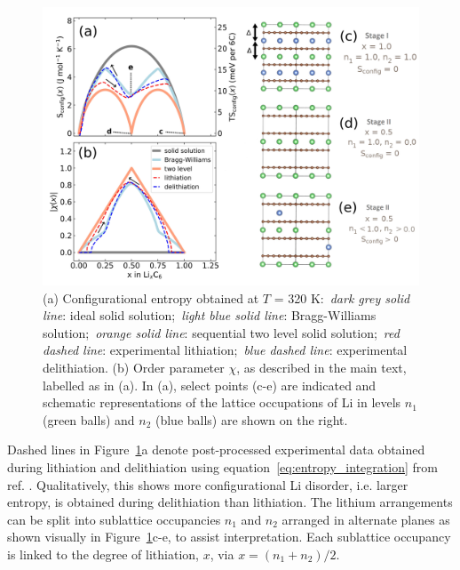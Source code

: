 \documentclass[../main.tex]{subfiles}
\begin{document}
\begin{figure}
    \centering
    \includegraphics[scale=0.36]{figures/order_parameter_scheme_v2.jpg}
    \caption{(a) Configurational entropy obtained at $T$ = 320 K:~\emph{dark grey solid line}: ideal solid solution;~\emph{light blue solid line}: Bragg-Williams solution;~\emph{orange solid line}: sequential two level solid solution;~\emph{red dashed line}: experimental lithiation;~\emph{blue dashed line}: experimental delithiation. (b) Order parameter \textbar{}\(\chi\)\textbar{}, as described in the main text, labelled as in (a). In (a), select points (c-e) are indicated and schematic representations of the lattice occupations of Li in levels $n_{1}$ (green balls) and $n_{2}$ (blue balls) are shown on the right.}
    \label{fig:entropy_scheme}
\end{figure}

Dashed lines in Figure~\ref{fig:entropy_scheme}a denote post-processed experimental data obtained during lithiation and delithiation using equation~\ref{eq:entropy_integration} from ref. . Qualitatively, this shows more configurational Li disorder, i.e. larger entropy, is obtained during delithiation than lithiation. The lithium arrangements can be split into sublattice occupancies $n_{1}$ and $n_{2}$ arranged in alternate planes as shown visually in Figure~\ref{fig:entropy_scheme}c-e, to assist interpretation. Each sublattice occupancy is linked to the degree of lithiation, $x$, via $x = (n_{1} + n_{2})/2$.
\end{document}
